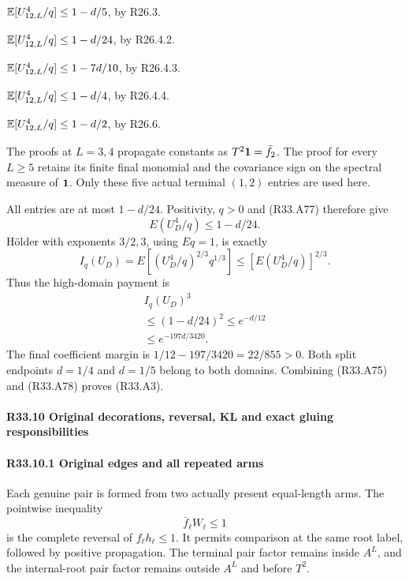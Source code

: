 \begin{description}[style=nextline,leftmargin=1.6em]
\item[$L=1$.] $\mathbb E[U_{12,L}^4/q]\le1-d/5$, by R26.3.
\item[$L=2$.] $\mathbb E[U_{12,L}^4/q]\le1-d/24$, by R26.4.2.
\item[$L=3$.] $\mathbb E[U_{12,L}^4/q]\le1-7d/10$, by R26.4.3.
\item[$L=4$.] $\mathbb E[U_{12,L}^4/q]\le1-d/4$, by R26.4.4.
\item[$L\ge5$.] $\mathbb E[U_{12,L}^4/q]\le1-d/2$, by R26.6.
\end{description}

The proofs at $L=3,4$ propagate constants as $T^2\mathbf1=\bar f_2$. The proof for every $L\ge5$ retains its finite final monomial and the covariance sign on the spectral measure of $\mathbf1$. Only these five actual terminal $(1,2)$ entries are used here.

All entries are at most \(1-d/24\). Positivity, \(q>0\) and (R33.A77)
therefore give
\[
E(U_D^4/q)\le1-d/24.
\]
Hölder with exponents \(3/2,\allowbreak \allowbreak  3\), using \(Eq=1\), is exactly
\[
I_q(U_D)
=E[(U_D^4/q)^{2/3}q^{1/3}]
\le[E(U_D^4/q)]^{2/3}.
\]
Thus the high-domain payment is
\[
\begin{gathered}
I_q(U_D)^3\\
\le(1-d/24)^2\le e^{-d/12}\\
\le e^{-197d/3420}.
\end{gathered}\tag{R33.A78}
\]
The final coefficient margin is
\(1/12-197/3420=22/855>0\).
Both split endpoints \(d=1/4\) and \(d=1/5\) belong to both domains.
Combining (R33.A75) and (R33.A78) proves (R33.A3).

\paragraph{R33.10 Original decorations, reversal, KL and exact gluing responsibilities}

\paragraph{R33.10.1 Original edges and all repeated arms}

Each genuine pair is formed from two actually present equal-length
arms. The pointwise inequality
\[
\bar f_\ell W_\ell\le1
\]
is the complete reversal of \(f_\ell h_\ell\le1\).
It permits comparison at the same root label, followed by positive
propagation.
The terminal pair factor remains inside \(A^L\), and the internal-root
pair factor remains outside \(A^L\) and before \(T^2\).

